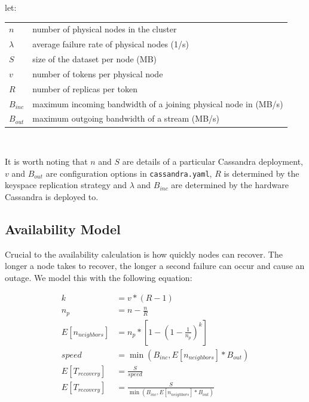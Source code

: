 \documentclass{article}
\makeatletter
\newenvironment{conditions}[1][let:]
  {#1 \begin{tabular}[t]{>{$}l<{$} @{${}={}$} l}}
  {\end{tabular}\\[\belowdisplayskip]}
\makeatother
\begin{document}
\begin{conditions}
 n       &  number of physical nodes in the cluster \\
 \lambda &  average failure rate of physical nodes (1/s) \\
 S       &  size of the dataset per node (MB) \\
 v       &  number of tokens per physical node \\
 R       &  number of replicas per token \\
 B_{inc} &  maximum incoming bandwidth of a joining physical node in (MB/s) \\
 B_{out} &  maximum outgoing bandwidth of a stream (MB/s) \\
\end{conditions}

It is worth noting that $n$ and $S$ are details of a particular Cassandra deployment, $v$ and $B_{out}$ are configuration options in \texttt{cassandra.yaml}, $R$ is determined by the keyspace replication strategy and $\lambda$ and $B_{inc}$ are determined by the hardware Cassandra is deployed to.

\subsection{Availability Model}
Crucial to the availability calculation is how quickly nodes can recover. The longer a node takes to recover, the longer a second failure can occur and cause an outage. We model this with the following equation:

\begin{subequations} \label{recovery}
    \begin{align}
        k & = v * (R - 1) \\ \label{recoverya}
        n_{p} & = n - \frac{n}{R} \\
        E[n_{neighbors}] & = n_{p} * [1 - (1-\frac{1}{n_{p}})^k] \label{recoveryc} \\
        speed & = \min(B_{inc}, E[n_{neighbors}] * B_{out}) \\
        E[T_{recovery}] & = \frac{S}{speed} \\
        E[T_{recovery}] & = \frac{S}{\min(B_{inc}, E[n_{neighbors}] * B_{out})}
    \end{align}
\end{subequations}
\end{document}
